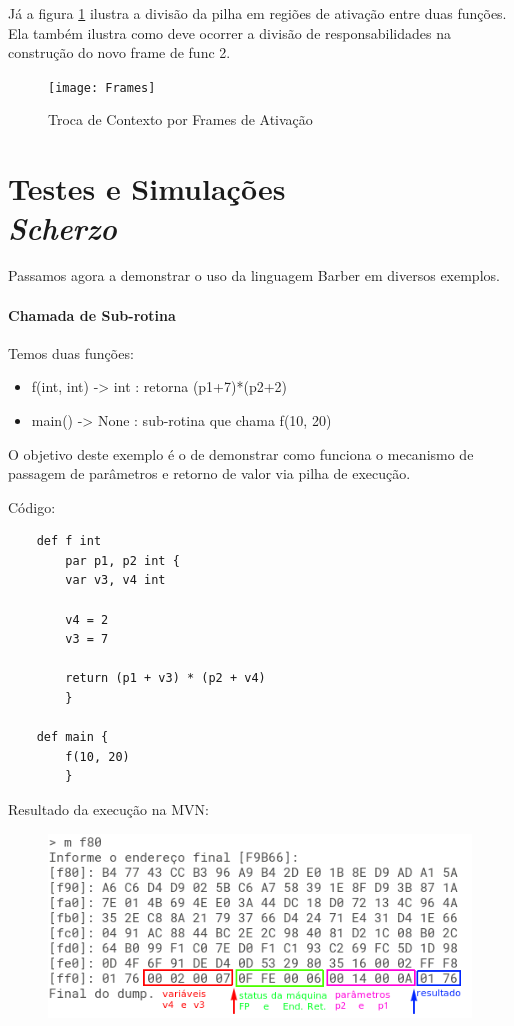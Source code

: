 \documentclass[a4paper,12pt]{report}
\begin{document}
    Já a figura \ref{fig:Frames} ilustra    a divisão da pilha em regiões de ativação entre duas funções. Ela também ilustra como deve ocorrer a divisão de responsabilidades na construção do novo frame de func 2.

    \begin{figure}[h]
        \centering
        \caption{Troca de Contexto por Frames de Ativação}
        \label{fig:Frames}
        \texttt{[image: Frames]}
    \end{figure}



    \part*{Testes e Simulações\\\textit{Scherzo}}
    Passamos agora a demonstrar o uso da linguagem Barber em diversos exemplos.
    
    \subsection*{Chamada de Sub-rotina}
    Temos duas funções:
    \begin{itemize}
        \item f(int, int) -> int : retorna (p1+7)*(p2+2)
        \item main() -> None : sub-rotina que chama f(10, 20)
    \end{itemize}
    O objetivo deste exemplo é o de demonstrar como funciona o mecanismo de passagem de parâmetros e retorno de valor via pilha de execução.

    Código:
    \begin{lstlisting}
    def f int 
        par p1, p2 int {
        var v3, v4 int

        v4 = 2
        v3 = 7

        return (p1 + v3) * (p2 + v4)
        }

    def main {
        f(10, 20)
        }
    \end{lstlisting}
    Resultado da execução na MVN:
    \begin{figure}[h]
        \centering
        \includegraphics[scale=0.65]{chamada_subrotina}
    \end{figure}
\end{document}
